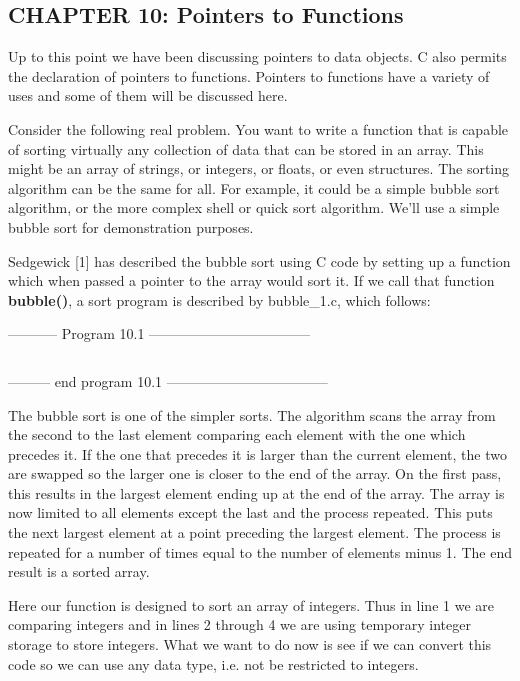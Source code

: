 \hypertarget{chapter-10-pointers-to-functions}{%
\subsection{CHAPTER 10: Pointers to
Functions}\label{chapter-10-pointers-to-functions}}

Up to this point we have been discussing pointers to data objects. C
also permits the declaration of pointers to functions. Pointers to
functions have a variety of uses and some of them will be discussed
here.

Consider the following real problem. You want to write a function that
is capable of sorting virtually any collection of data that can be
stored in an array. This might be an array of strings, or integers, or
floats, or even structures. The sorting algorithm can be the same for
all. For example, it could be a simple bubble sort algorithm, or the
more complex shell or quick sort algorithm. We'll use a simple bubble
sort for demonstration purposes.

Sedgewick {[}1{]} has described the bubble sort using C code by setting
up a function which when passed a pointer to the array would sort it. If
we call that function \textbf{bubble()}, a sort program is described by
bubble\_1.c, which follows:

-----------  Program 10.1  -----------------------------------
\inputminted[breaklines]{c}{../src/ch10-1.c}
--------- end program 10.1 -----------------------------------

The bubble sort is one of the simpler sorts. The algorithm scans the
array from the second to the last element comparing each element with
the one which precedes it. If the one that precedes it is larger than
the current element, the two are swapped so the larger one is closer to
the end of the array. On the first pass, this results in the largest
element ending up at the end of the array. The array is now limited to
all elements except the last and the process repeated. This puts the
next largest element at a point preceding the largest element. The
process is repeated for a number of times equal to the number of
elements minus 1. The end result is a sorted array.

Here our function is designed to sort an array of integers. Thus in line
1 we are comparing integers and in lines 2 through 4 we are using
temporary integer storage to store integers. What we want to do now is
see if we can convert this code so we can use any data type, i.e. not be
restricted to integers.


